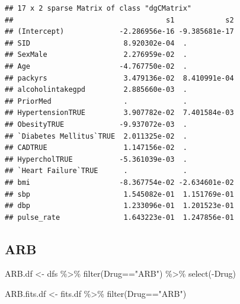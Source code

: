 \documentclass[
]{article}
\newenvironment{Shaded}{\begin{snugshade}}{\end{snugshade}}
\newcommand{\FloatTok}[1]{\textcolor[rgb]{0.00,0.00,0.81}{#1}}
\newcommand{\FunctionTok}[1]{\textcolor[rgb]{0.00,0.00,0.00}{#1}}
\newcommand{\NormalTok}[1]{#1}
\newcommand{\OtherTok}[1]{\textcolor[rgb]{0.56,0.35,0.01}{#1}}
\newcommand{\SpecialCharTok}[1]{\textcolor[rgb]{0.00,0.00,0.00}{#1}}
\newcommand{\StringTok}[1]{\textcolor[rgb]{0.31,0.60,0.02}{#1}}
\begin{document}
\begin{Shaded}
\end{Shaded}

\begin{verbatim}
## 17 x 2 sparse Matrix of class "dgCMatrix"
##                                    s1            s2
## (Intercept)             -2.286956e-16 -9.385681e-17
## SID                      8.920302e-04  .           
## SexMale                  2.276959e-02  .           
## Age                     -4.767750e-02  .           
## packyrs                  3.479136e-02  8.410991e-04
## alcoholintakegpd         2.885660e-03  .           
## PriorMed                 .             .           
## HypertensionTRUE         3.907782e-02  7.401584e-03
## ObesityTRUE             -9.937072e-03  .           
## `Diabetes Mellitus`TRUE  2.011325e-02  .           
## CADTRUE                  1.147156e-02  .           
## HypercholTRUE           -5.361039e-03  .           
## `Heart Failure`TRUE      .             .           
## bmi                     -8.367754e-02 -2.634601e-02
## sbp                      1.545082e-01  1.151769e-01
## dbp                      1.233096e-01  1.201523e-01
## pulse_rate               1.643223e-01  1.247856e-01
\end{verbatim}

\hypertarget{arb}{%
\subsection{ARB}\label{arb}}

\begin{Shaded}
\begin{Highlighting}[]
\NormalTok{ARB.df }\OtherTok{\textless{}{-}}\NormalTok{ dfs }\SpecialCharTok{\%\textgreater{}\%} 
  \FunctionTok{filter}\NormalTok{(Drug}\SpecialCharTok{==}\StringTok{"ARB"}\NormalTok{) }\SpecialCharTok{\%\textgreater{}\%} 
  \FunctionTok{select}\NormalTok{(}\SpecialCharTok{{-}}\NormalTok{Drug)}
\end{Highlighting}
\end{Shaded}

\begin{Shaded}
\begin{Highlighting}[]
\NormalTok{ARB.fits.df }\OtherTok{\textless{}{-}}\NormalTok{ fits.df }\SpecialCharTok{\%\textgreater{}\%} 
  \FunctionTok{filter}\NormalTok{(Drug}\SpecialCharTok{==}\StringTok{"ARB"}\NormalTok{)}
\end{Highlighting}
\end{Shaded}
\end{document}
